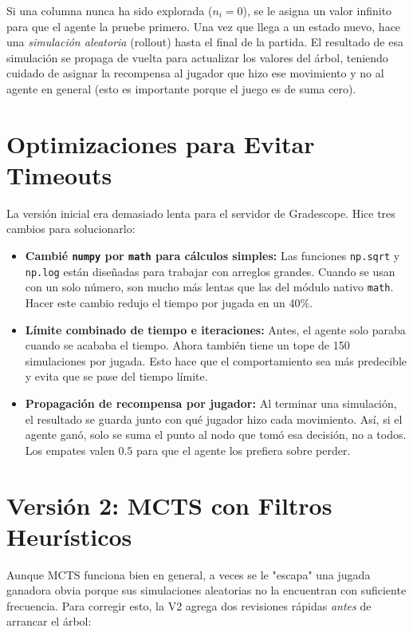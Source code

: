 \documentclass[11pt,a4paper]{article}
\begin{document}
Si una columna nunca ha sido explorada ($n_i = 0$), se le asigna un valor infinito para que el agente la pruebe primero. Una vez que llega a un estado nuevo, hace una \textit{simulación aleatoria} (rollout) hasta el final de la partida. El resultado de esa simulación se propaga de vuelta para actualizar los valores del árbol, teniendo cuidado de asignar la recompensa al jugador que hizo ese movimiento y no al agente en general (esto es importante porque el juego es de suma cero).

\section{Optimizaciones para Evitar Timeouts}

La versión inicial era demasiado lenta para el servidor de Gradescope. Hice tres cambios para solucionarlo:

\begin{itemize}
    \item \textbf{Cambié \texttt{numpy} por \texttt{math} para cálculos simples:} Las funciones \texttt{np.sqrt} y \texttt{np.log} están diseñadas para trabajar con arreglos grandes. Cuando se usan con un solo número, son mucho más lentas que las del módulo nativo \texttt{math}. Hacer este cambio redujo el tiempo por jugada en un 40\%.
    \item \textbf{Límite combinado de tiempo e iteraciones:} Antes, el agente solo paraba cuando se acababa el tiempo. Ahora también tiene un tope de 150 simulaciones por jugada. Esto hace que el comportamiento sea más predecible y evita que se pase del tiempo límite.
    \item \textbf{Propagación de recompensa por jugador:} Al terminar una simulación, el resultado se guarda junto con qué jugador hizo cada movimiento. Así, si el agente ganó, solo se suma el punto al nodo que tomó esa decisión, no a todos. Los empates valen $0.5$ para que el agente los prefiera sobre perder.
\end{itemize}

\section{Versión 2: MCTS con Filtros Heurísticos}

Aunque MCTS funciona bien en general, a veces se le "escapa" una jugada ganadora obvia porque sus simulaciones aleatorias no la encuentran con suficiente frecuencia. Para corregir esto, la V2 agrega dos revisiones rápidas \textit{antes} de arrancar el árbol:
\end{document}
